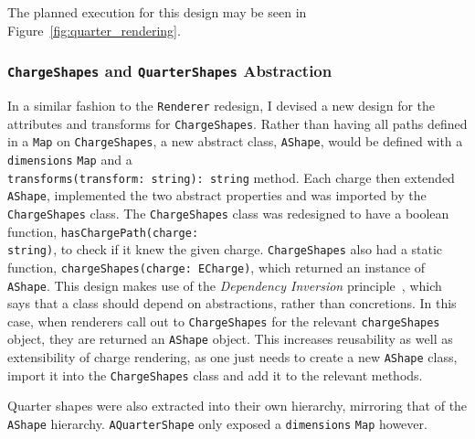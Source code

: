 \documentclass[nobib, a4paper, twoside, justified]{tufte-book}
\begin{document}
The planned execution for this design may be seen in Figure~\ref{fig:quarter_rendering}.

\subsubsection{\texttt{ChargeShapes} and \texttt{QuarterShapes} Abstraction}%
\label{ssub:chargeshape_and_quartershape_abstraction}

In a similar fashion to the \texttt{Renderer} redesign, I devised a new design for the attributes
and transforms for \texttt{ChargeShapes}. Rather than having all paths defined in a \texttt{Map} on
\texttt{ChargeShapes}, a new abstract class, \texttt{AShape}, would be defined with a
\texttt{dimensions} \texttt{Map} and a \\ \texttt{transforms(transform: string): string} method.
Each charge then extended \texttt{AShape}, implemented the two abstract properties and was imported
by the \texttt{ChargeShapes} class. The \texttt{ChargeShapes} class was redesigned to have a
boolean function, \texttt{hasChargePath(charge:\\ string)}, to check if it knew the given charge.
\texttt{ChargeShapes} also had a static function, \texttt{chargeShapes(charge: ECharge)}, which
returned an instance of \texttt{AShape}. This design makes use of the \textit{Dependency Inversion}
principle~\autocite{martin2000design}, which says that a class should depend on abstractions,
rather than concretions. In this case, when renderers call out to \texttt{ChargeShapes} for the
relevant \texttt{chargeShapes} object, they are returned an \texttt{AShape} object. This increases
reusability as well as extensibility of charge rendering, as one just needs to create a new
\texttt{AShape} class, import it into the \texttt{ChargeShapes} class and add it to the relevant
methods.

Quarter shapes were also extracted into their own hierarchy, mirroring that of the \texttt{AShape}
hierarchy. \texttt{AQuarterShape} only exposed a \texttt{dimensions} \texttt{Map} however.

\end{document}
